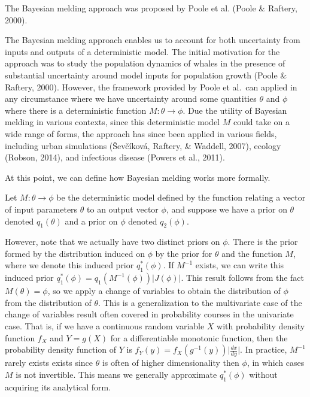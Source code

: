 \documentclass[12pt,twoside]{smiththesis}
\begin{document}
The Bayesian melding approach was proposed by Poole et al. (Poole \& Raftery, 2000).

The Bayesian melding approach enables us to account for both uncertainty from inputs and outputs of a deterministic model. The initial motivation for the approach was to study the population dynamics of whales in the presence of substantial uncertainty around model inputs for population growth (Poole \& Raftery, 2000). However, the framework provided by Poole et al.~can applied in any circumstance where we have uncertainty around some quantities \(\theta\) and \(\phi\) where there is a deterministic function \(M:\theta \to\phi\). Due the utility of Bayesian melding in various contexts, since this deterministic model \(M\) could take on a wide range of forms, the approach has since been applied in various fields, including urban simulations (Ševčíková, Raftery, \& Waddell, 2007), ecology (Robson, 2014), and infectious disease (Powers et al., 2011).

At this point, we can define how Bayesian melding works more formally.

Let \(M: \theta \to \phi\) be the deterministic model defined by the function relating a vector of input parameters \(\theta\) to an output vector \(\phi\), and suppose we have a prior on \(\theta\) denoted \(q_1(\theta)\) and a prior on \(\phi\) denoted \(q_2(\phi)\).

However, note that we actually have two distinct priors on \(\phi\). There is the prior formed by the distribution induced on \(\phi\) by the prior for \(\theta\) and the function \(M\), where we denote this induced prior \(q^*_1(\phi)\).
If \(M^{-1}\) exists, we can write this induced prior \(q_1^*(\phi) = q_1(M^{-1}(\phi)) |J(\phi)|\). This result follows from the fact \(M(\theta) = \phi\), so we apply a change of variables to obtain the distribution of \(\phi\) from the distribution of \(\theta\). This is a generalization to the multivariate case of the change of variables result often covered in probability courses in the univariate case. That is, if we have a continuous random variable \(X\) with probability density function \(f_X\) and \(Y=g(X)\) for a differentiable monotonic function, then the probability density function of \(Y\) is \(f_Y(y) = f_X(g^{-1}(y)) \Big| \frac{dx}{dy} \Big|\). In practice, \(M^{-1}\) rarely exists exists since \(\theta\) is often of higher dimensionality then \(\phi\), in which cases \(M\) is not invertible. This means we generally approximate \(q^*_1(\phi)\) without acquiring its analytical form.
\end{document}
